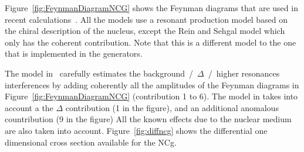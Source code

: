 Figure~\ref{fig:FeynmanDiagramNCG} shows the Feynman diagrams that are
used in recent
calculations~\cite{Alvarez2014,Hills2007,Rosner2015,Serot2012,Jenkins,ReinCohGamma}. All
the models use a resonant production model based on the chiral
description of the nucleus, except the Rein and Sehgal model which
only has the coherent contribution. Note that this is a different
model to the one that is implemented in the generators.

The model in~\cite{Alvarez2014} carefully estimates the
background~/~$\Delta$~/~higher resonances interferences by adding
coherently all the amplitudes of the Feynman diagrams in
Figure~\ref{fig:FeynmanDiagramNCG} (contribution 1 to 6). The model in
\cite{Hills2007} takes into account a the $\Delta$ contribution (1 in
the figure), and an additional anomalous countribution (9 in the
figure) All the known effects due to the nuclear medium are also taken
into account.  Figure~\ref{fig:diffncg} shows the differential one
dimensional cross section available for the \Gls{NCg}.

